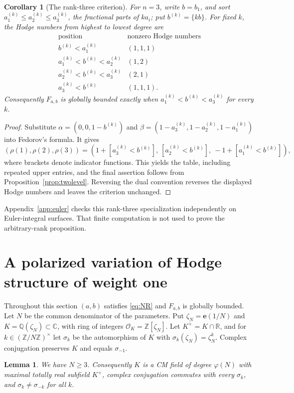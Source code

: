 \documentclass[11pt]{amsart}
\newtheorem{lemma}[theorem]{Lemma}
\newtheorem{corollary}[theorem]{Corollary}
\theoremstyle{definition}
\theoremstyle{remark}
\numberwithin{equation}{section}
\newcommand{\Q}{\mathbb{Q}}
\newcommand{\Z}{\mathbb{Z}}
\newcommand{\C}{\mathbb{C}}
\newcommand{\R}{\mathbb{R}}
\newcommand{\e}{\mathbf{e}}
\newcommand{\cO}{\mathcal{O}}
\newcommand{\ak}[1]{a^{(k)}_{#1}}
\newcommand{\bk}{b^{(k)}}
\newcommand{\Fab}{F_{a,b}}
\begin{document}
\begin{corollary}[The rank-three criterion]\label{cor:rankthree}
For $n=3$, write $b=b_1$, and sort $\ak1\le\ak2\le\ak3$, the fractional parts of $ka_i$; put $\bk=\{kb\}$. For fixed $k$, the Hodge numbers from highest to lowest degree are
\[
\begin{array}{c|c}
\text{position}&\text{nonzero Hodge numbers}\\\hline
\bk<\ak1 &(1,1,1)\\
\ak1<\bk<\ak2 &(1,2)\\
\ak2<\bk<\ak3 &(2,1)\\
\ak3<\bk &(1,1,1).
\end{array}
\]
Consequently $\Fab$ is globally bounded exactly when $\ak1<\bk<\ak3$ for every $k$.
\end{corollary}
\begin{proof}
Substitute $\alpha=(0,0,1-\bk)$ and $\beta=(1-\ak3,1-\ak2,1-\ak1)$ into Fedorov's formula. It gives
\[
(\rho(1),\rho(2),\rho(3))=
(1+[\ak3<\bk],\ [\ak2<\bk],\ -1+[\ak1<\bk]),
\]
where brackets denote indicator functions. This yields the table, including repeated upper entries, and the final assertion follows from Proposition~\ref{prop:twolevel}. Reversing the dual convention reverses the displayed Hodge numbers and leaves the criterion unchanged.
\end{proof}
Appendix~\ref{app:euler} checks this rank-three specialization independently on Euler-integral surfaces. That finite computation is not used to prove the arbitrary-rank proposition.



\section{A polarized variation of Hodge structure of weight one}\label{sec:wt1}

Throughout this section $(a,b)$ satisfies \eqref{eq:NR} and $\Fab$ is globally bounded. Let $N$ be the common denominator of the parameters. Put $\zeta_N=\e(1/N)$ and $K=\Q(\zeta_N)\subset\C$, with ring of integers $\cO_K=\Z[\zeta_N]$. Let $K^+=K\cap\R$, and for $k\in(\Z/N\Z)^\times$ let $\sigma_k$ be the automorphism of $K$ with $\sigma_k(\zeta_N)=\zeta_N^k$. Complex conjugation preserves $K$ and equals $\sigma_{-1}$.

\begin{lemma}\label{lem:CM}
We have $N\ge3$. Consequently $K$ is a CM field of degree $\varphi(N)$ with maximal totally real subfield $K^+$, complex conjugation commutes with every $\sigma_k$, and $\sigma_k\ne\sigma_{-k}$ for all $k$.
\end{lemma}
\end{document}
